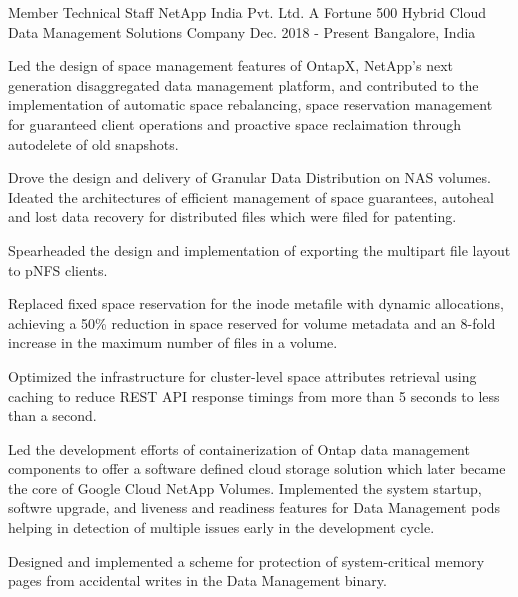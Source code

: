 

\begin{cventries}

  \expentry
    {Member Technical Staff} %
    {NetApp} {India Pvt. Ltd.} %
    {A Fortune 500 Hybrid Cloud Data Management Solutions Company} %
    {Dec. 2018 - Present} %
    {Bangalore, India} %
    {
      \begin{cvitems} %
        \item {Led the design of space management features of OntapX, NetApp's next generation disaggregated data management
		platform, and contributed to the implementation of automatic space rebalancing, space reservation management for
		guaranteed client operations and proactive space reclaimation through autodelete of old snapshots. }
        \item {Drove the design and delivery of Granular Data Distribution on NAS volumes. Ideated the architectures of efficient
		management of space guarantees, autoheal and lost data recovery for distributed files which were filed for
		patenting.}
        \item {Spearheaded the design and implementation of exporting the multipart file layout to pNFS clients.}
	\item {Replaced fixed space reservation for the inode metafile with dynamic allocations, achieving a 50\% reduction in
		space reserved for volume metadata and an 8-fold increase in the maximum number of files in a volume.}
        \item {Optimized the infrastructure for cluster-level space attributes retrieval using caching to reduce REST API
		response timings from more than 5 seconds to less than a second.}
	\item {Led the development efforts of containerization of Ontap data management components to offer a software defined
		cloud storage solution which later became the core of Google Cloud NetApp Volumes. Implemented the system startup,
		softwre upgrade, and liveness and readiness features for Data Management pods helping in detection of multiple
		issues early in the development cycle.}
        \item {Designed and implemented a scheme for protection of system-critical memory pages from accidental writes in the
		Data Management binary.}
      \end{cvitems}
    }


\end{cventries}
